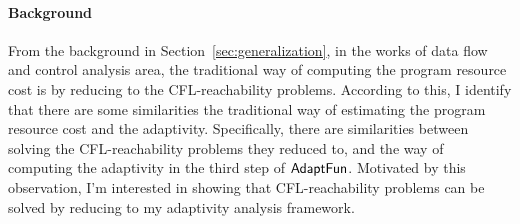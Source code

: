 \paragraph{Background}
\label{sec:cfl-backgroung}
From the background in Section~\ref{sec:generalization},
in the works of data flow and control analysis area,
the traditional way of computing the program resource cost is
by reducing to the CFL-reachability problems.
%
According to this, 
I identify 
that there are some similarities the traditional way of estimating the program resource cost and 
the adaptivity.
Specifically, there are similarities between solving the CFL-reachability problems they reduced to,
 and the way of computing the adaptivity in 
the third step of $\textsf{AdaptFun}$.
 Motivated by this observation, 
 I'm interested in showing that
 CFL-reachability problems can be solved by reducing to my adaptivity analysis framework.
